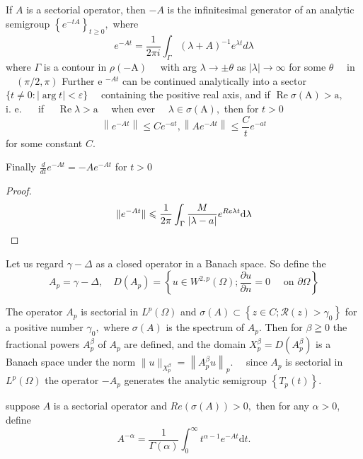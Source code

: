 \begin{theorem}
	If $A$ is a sectorial operator, then $-A$ is the infinitesimal generator of an analytic semigroup $\left\{e^{-t A}\right\}_{t \geq 0},$ where
	$$
	e^{-A t}=\frac{1}{2 \pi i} \int_{\Gamma}(\lambda+A)^{-1} e^{\lambda t} d \lambda
	$$
	where $\Gamma$ is a contour in $\rho(-\mathrm{A}) \quad$ with arg $\lambda \rightarrow \pm \theta$ as $|\lambda| \rightarrow \infty$ for
	some $\theta \quad$ in $\quad(\pi / 2, \pi)$
	Further e $^{-A t}$ can be continued analytically into a sector
	$\{t \neq 0:|\arg t|<\varepsilon\} \quad$ containing the positive real axis, and if
	$\operatorname{Re} \sigma(\mathrm{A})>\mathrm{a}, \quad$ i. e. $\quad$ if $\quad \operatorname{Re} \lambda>\mathrm{a} \quad$ when ever $\quad \lambda \in \sigma(\mathrm{A}),$ then for $t>0$
	$$
	\left\|e^{-A t}\right\| \leq C e^{-a t},\left\|A e^{-A t}\right\| \leq \frac{C}{t} e^{-a t}
	$$
	for some constant $C$.
	
	Finally $\frac{d}{d t} e^{-A t}=-A e^{-A t}$ for $t>0$
	\end{theorem}

\begin{proof}
\begin{equation}
	\|e^{-At}\| \leqslant \frac{1}{2\pi}\int_\Gamma\frac{M}{|\lambda - a|}e^{Re \lambda t}\mathrm{d}\lambda\\
\end{equation}
\end{proof}

Let us regard $\gamma-\Delta$ as a closed operator in a Banach space. So define the
$$
A_{p}=\gamma-\Delta, \quad D\left(A_{p}\right)=\left\{u \in W^{2, p}(\Omega) ; \frac{\partial u}{\partial n}=0 \quad \text { on } \partial \Omega\right\}
$$

The operator $A_{p}$ is sectorial in $L^{p}(\Omega)$ and $\sigma(A) \subset\left\{z \in C ; \mathscr{R}(z)>\gamma_{0}\right\}$ for a positive number $\gamma_{0},$ where $\sigma(A)$ is the spectrum of $A_{p} .$ Then for $\beta \geqq 0$ the fractional powers $A_{p}^{\beta}$ of $A_{p}$ are defined, and the domain $X_{p}^{\beta}=D\left(A_{p}^{\beta}\right)$ is a Banach space under the norm $\|u\|_{X_{p}^{\beta}}=\left\|A_{p}^{\beta} u\right\|_{p} . \quad$ since $A_{p}$ is sectorial in $L^{p}(\Omega)$ the operator $-A_{p}$ generates the analytic semigroup $\left\{T_{p}(t)\right\} .$ 

\begin{definition}
	suppose $A$ is a sectorial operator and $Re(\sigma(A))>0,$ then for any $\alpha>0$, define 
	\begin{equation}
		A^{-\alpha} = \frac{1}{\Gamma(\alpha)}\int_0^{\infty}t^{\alpha-1}e^{-At}\mathrm{d}t.
	\end{equation}
\end{definition}

